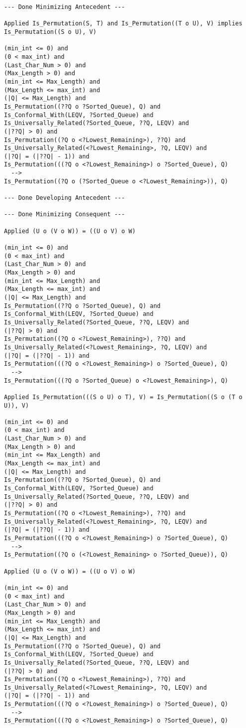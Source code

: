 \begin{lstlisting}[language=resolve]
--- Done Minimizing Antecedent ---

Applied Is_Permutation(S, T) and Is_Permutation((T o U), V) implies Is_Permutation((S o U), V)

(min_int <= 0) and
(0 < max_int) and
(Last_Char_Num > 0) and
(Max_Length > 0) and
(min_int <= Max_Length) and
(Max_Length <= max_int) and
(|Q| <= Max_Length) and
Is_Permutation((??Q o ?Sorted_Queue), Q) and
Is_Conformal_With(LEQV, ?Sorted_Queue) and
Is_Universally_Related(?Sorted_Queue, ??Q, LEQV) and
(|??Q| > 0) and
Is_Permutation((?Q o <?Lowest_Remaining>), ??Q) and
Is_Universally_Related(<?Lowest_Remaining>, ?Q, LEQV) and
(|?Q| = (|??Q| - 1)) and
Is_Permutation(((?Q o <?Lowest_Remaining>) o ?Sorted_Queue), Q)
  -->
Is_Permutation((?Q o (?Sorted_Queue o <?Lowest_Remaining>)), Q)

--- Done Developing Antecedent ---

--- Done Minimizing Consequent ---

Applied (U o (V o W)) = ((U o V) o W)

(min_int <= 0) and
(0 < max_int) and
(Last_Char_Num > 0) and
(Max_Length > 0) and
(min_int <= Max_Length) and
(Max_Length <= max_int) and
(|Q| <= Max_Length) and
Is_Permutation((??Q o ?Sorted_Queue), Q) and
Is_Conformal_With(LEQV, ?Sorted_Queue) and
Is_Universally_Related(?Sorted_Queue, ??Q, LEQV) and
(|??Q| > 0) and
Is_Permutation((?Q o <?Lowest_Remaining>), ??Q) and
Is_Universally_Related(<?Lowest_Remaining>, ?Q, LEQV) and
(|?Q| = (|??Q| - 1)) and
Is_Permutation(((?Q o <?Lowest_Remaining>) o ?Sorted_Queue), Q)
  -->
Is_Permutation(((?Q o ?Sorted_Queue) o <?Lowest_Remaining>), Q)

Applied Is_Permutation(((S o U) o T), V) = Is_Permutation((S o (T o U)), V)

(min_int <= 0) and
(0 < max_int) and
(Last_Char_Num > 0) and
(Max_Length > 0) and
(min_int <= Max_Length) and
(Max_Length <= max_int) and
(|Q| <= Max_Length) and
Is_Permutation((??Q o ?Sorted_Queue), Q) and
Is_Conformal_With(LEQV, ?Sorted_Queue) and
Is_Universally_Related(?Sorted_Queue, ??Q, LEQV) and
(|??Q| > 0) and
Is_Permutation((?Q o <?Lowest_Remaining>), ??Q) and
Is_Universally_Related(<?Lowest_Remaining>, ?Q, LEQV) and
(|?Q| = (|??Q| - 1)) and
Is_Permutation(((?Q o <?Lowest_Remaining>) o ?Sorted_Queue), Q)
  -->
Is_Permutation((?Q o (<?Lowest_Remaining> o ?Sorted_Queue)), Q)

Applied (U o (V o W)) = ((U o V) o W)

(min_int <= 0) and
(0 < max_int) and
(Last_Char_Num > 0) and
(Max_Length > 0) and
(min_int <= Max_Length) and
(Max_Length <= max_int) and
(|Q| <= Max_Length) and
Is_Permutation((??Q o ?Sorted_Queue), Q) and
Is_Conformal_With(LEQV, ?Sorted_Queue) and
Is_Universally_Related(?Sorted_Queue, ??Q, LEQV) and
(|??Q| > 0) and
Is_Permutation((?Q o <?Lowest_Remaining>), ??Q) and
Is_Universally_Related(<?Lowest_Remaining>, ?Q, LEQV) and
(|?Q| = (|??Q| - 1)) and
Is_Permutation(((?Q o <?Lowest_Remaining>) o ?Sorted_Queue), Q)
  -->
Is_Permutation(((?Q o <?Lowest_Remaining>) o ?Sorted_Queue), Q)


\end{lstlisting}
